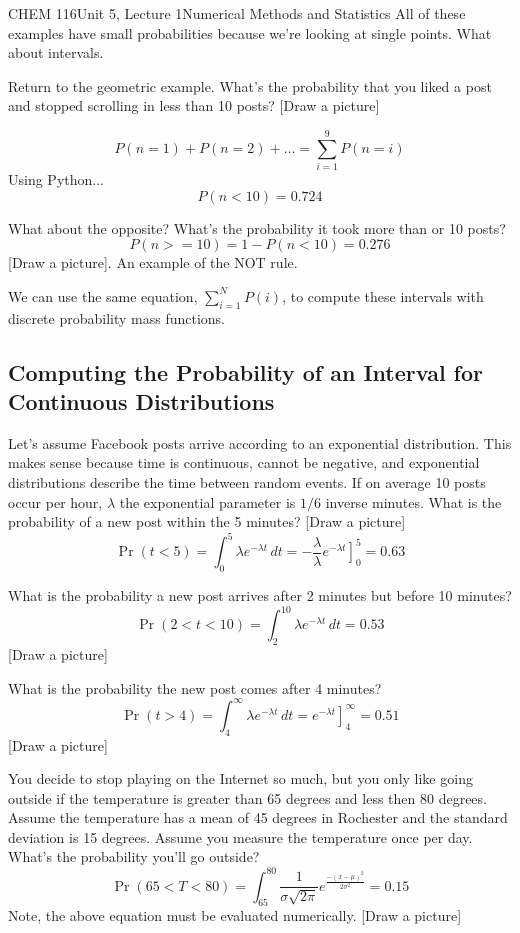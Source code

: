 \documentclass{article}
\begin{document}
\begin{tdoc}{CHEM 116}{Unit 5, Lecture 1}{Numerical Methods and Statistics}
 All of these examples have small probabilities because we're looking
 at single points. What about intervals.

Return to the geometric example. What's the probability that you liked
a post and stopped scrolling in less than 10 posts? [Draw a picture]

\[
P(n = 1) + P(n = 2) + ... = \sum_{i=1}^{9} P(n = i)
\]
Using Python...
\[
P(n < 10) = 0.724
\]

What about the opposite? What's the probability it took more than or
10 posts?
\[
P(n >= 10) = 1 - P(n < 10) = 0.276
\]
[Draw a picture]. An example of the NOT rule.

We can use the same equation, $\sum_{i=1}^N P(i)$, to compute these
intervals with discrete probability mass functions.

\subsection{Computing the Probability of an Interval for Continuous Distributions}

Let's assume Facebook posts arrive according to an exponential
distribution. This makes sense because time is continuous, cannot be
negative, and exponential distributions describe the time between
random events. If on average 10 posts occur per hour, $\lambda$ the
exponential parameter is $1/6$ inverse minutes. What is the probability of a
new post within the 5 minutes? [Draw a picture]
\[
\Pr(t < 5) = \int_0^{5} \lambda e^{-\lambda t}\,dt = -\frac{\lambda}{\lambda}\left.e^{-\lambda t}\right]_0^{5} = 0.63
\]

What is the probability a new post arrives after 2 minutes but before 10 minutes?
\[
\Pr(2 < t < 10) = \int_{2}^{10} \lambda e^{-\lambda t}\,dt  = 0.53
\]
[Draw a picture]

What is the probability the new post comes after 4 minutes?
\[
\Pr(t > 4) = \int_4^{\infty}  \lambda e^{-\lambda t}\,dt = \left.e^{-\lambda t}\right]_4^{\infty} = 0.51
\]
[Draw a picture]

You decide to stop playing on the Internet so much, but you only like
going outside if the temperature is greater than 65 degrees and less
then 80 degrees. Assume the temperature has a mean of 45 degrees in
Rochester and the standard deviation is 15 degrees. Assume you measure
the temperature once per day. What's the probability you'll go outside?
\[
\Pr(65 < T < 80) = \int_{65}^{80} \frac{1}{\sigma\sqrt{2\pi}}e^{\frac{-(x - \mu)^2}{2\sigma ^2}} = 0.15
\]
Note, the above equation must be evaluated numerically. [Draw a
  picture]


\end{tdoc}
\end{document}
